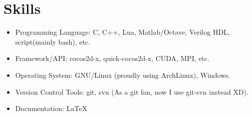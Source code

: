 \documentclass[letterpaper]{article}
\begin{document}
\section*{Skills}
\begin{itemize}
    \item Programming Language: C, C++, Lua, Matlab/Octave, Verilog HDL, script(mainly bash), etc.
    \item Framework/API: cocos2d-x, quick-cocos2d-x, CUDA, MPI, etc.
    \item Operating System: GNU/Linux (proudly using ArchLinux), Windows.
    \item Version Control Tools: git, svn (As a git fan, now I use git-svn instead XD).
    \item Documentation: \LaTeX
\end{itemize}
\end{document}
